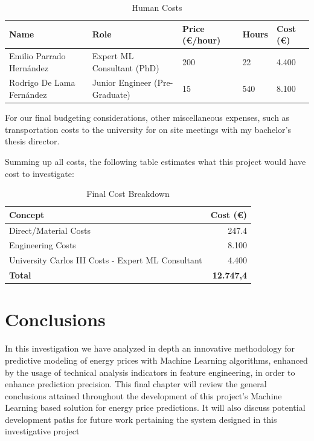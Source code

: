 \documentclass[12pt]{report} %
\begin{document}
\begin{table}[H]
	\caption{Human Costs}
	\centering
	\begin{tabular}{|P{4cm}|P{3.5cm}|P{1.8cm}|P{1.5cm}|P{1.5cm}|}
		\hline
		\textbf{Name} & \textbf{Role} & \textbf{Price (€/hour)} & \textbf{Hours} & \textbf{Cost (€)} \\
		\hline
		Emilio Parrado Hernández & Expert ML Consultant (PhD) & 200 & 22 & 4.400 \\
		\hline
		Rodrigo De Lama Fernández & Junior Engineer (Pre-Graduate) & 15 & 540 & 8.100 \\
		\hline
	\end{tabular}
\end{table}

For our final budgeting considerations, other miscellaneous expenses, such as transportation costs to the university for on site meetings with my bachelor's thesis director.

Summing up all costs, the following table estimates what this project would have cost to investigate:

\begin{table}[H]
    \caption{Final Cost Breakdown}
    \centering
    \begin{tabular}{|l|r|}
        \hline
        \textbf{Concept} & \textbf{Cost (€)} \\
        \hline
        Direct/Material Costs & 247.4 \\
        Engineering Costs & 8.100 \\
        University Carlos III Costs - Expert ML Consultant & 4.400 \\
        \hline
        \textbf{Total} & \textbf{12.747,4} \\
        \hline
    \end{tabular}
\end{table}



\chapter{Conclusions}
In this investigation we have analyzed in depth an innovative methodology for predictive modeling of energy prices with Machine Learning algorithms, enhanced by the usage of technical analysis indicators in feature engineering, in order to enhance prediction precision. This final chapter will review the general conclusions attained throughout the development of this project's Machine Learning based solution for energy price predictions. It will also discuss potential development paths for future work pertaining the system designed in this investigative project
\end{document}
